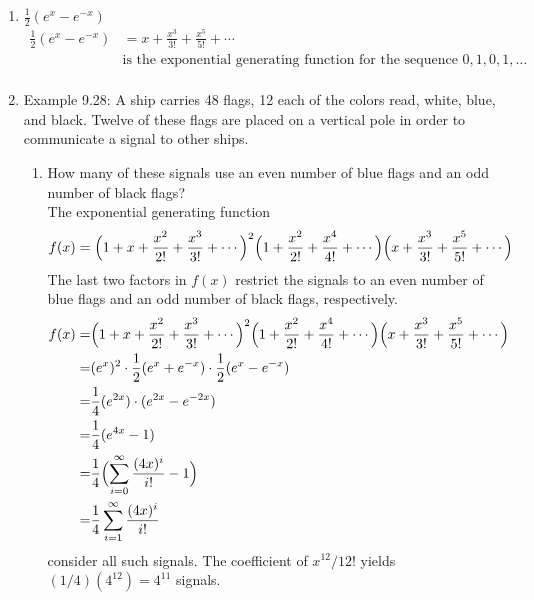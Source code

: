 \documentclass[a4paper]{article}
\begin{document}
\begin{enumerate}
\item $\frac{1}{2}(e^x-e^{-x})$
\begin{align*}
\frac{1}{2}(e^x-e^{-x})&=x+\frac{x^3}{3!}+\frac{x^5}{5!}+\cdots\\
&\text{is the exponential generating function for the sequence }0,1,0,1,\dots\\
\end{align*}

\item Example 9.28: A ship carries 48 flags, 12 each of the colors read, white, blue, and black. Twelve of these flags are placed on a vertical pole in order to communicate a signal to other ships.
\begin{enumerate}[label=(\alph*)]
\item How many of these signals use an even number of blue flags and an odd number of black flags?\\
The exponential generating function
$$
f(x)=\Bigl(1+x+\frac{x^2}{2!}+\frac{x^3}{3!}+\cdots\Bigr)^2\Bigl(1+\frac{x^2}{2!}+\frac{x^4}{4!}+\cdots\Bigr)\Bigl(x+\frac{x^3}{3!}+\frac{x^5}{5!}+\cdots\Bigr)
$$
The last two factors in $f(x)$ restrict the signals to an even number of blue flags and an odd number of black flags, respectively.
\begin{align*}
f(x)=&\Bigl(1+x+\frac{x^2}{2!}+\frac{x^3}{3!}+\cdots\Bigr)^2\Bigl(1+\frac{x^2}{2!}+\frac{x^4}{4!}+\cdots\Bigr)\Bigl(x+\frac{x^3}{3!}+\frac{x^5}{5!}+\cdots\Bigr)\\
=&(e^x)^2\cdot\frac{1}{2}(e^x+e^{-x})\cdot\frac{1}{2}(e^x-e^{-x})\\
=&\frac{1}{4}(e^{2x})\cdot(e^{2x}-e^{-2x})\\
=&\frac{1}{4}(e^{4x}-1)\\
=&\frac{1}{4}\Bigl(\sum_{i=0}^{\infty}{\frac{(4x)^i}{i!}}-1\Bigr)\\
=&\frac{1}{4}\sum_{i=1}^{\infty}{\frac{(4x)^i}{i!}}\\
\end{align*}
consider all such signals. The coefficient of ${x^{12}}/{12!}$ yields $(1/4)(4^{12})=4^{11}$ signals.
\end{enumerate}
\end{enumerate}
\end{document}
